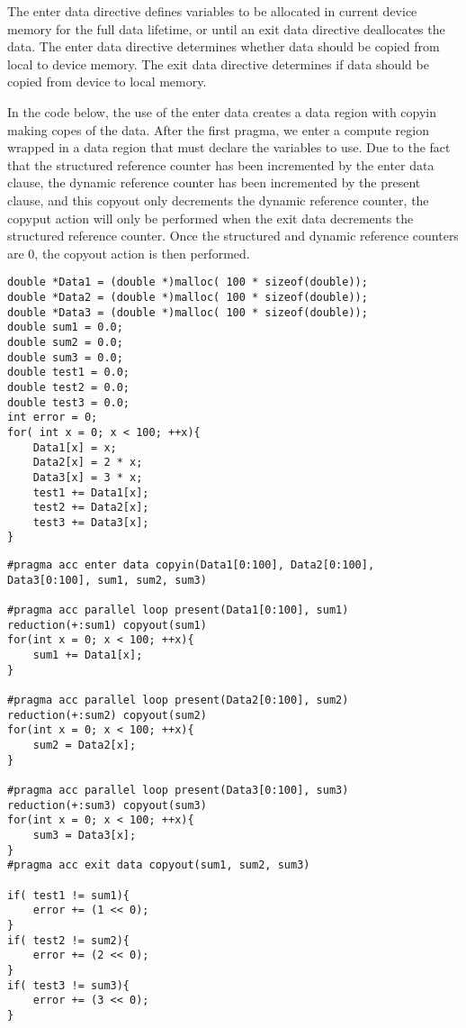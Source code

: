The enter data directive defines variables to be allocated in current device memory for the full data lifetime, or until an exit data directive deallocates the data. The enter data directive determines whether data should be copied from local to device memory. The exit data directive determines if data should be copied from device to local memory\cite{OpenACCSpec}.

In the code below, the use of the enter data creates a data region with copyin making copes of the data. After the first pragma, we enter a compute region wrapped in a data region that must declare the variables to use. Due to the fact that the structured reference counter has been incremented by the enter data clause, the dynamic reference counter has been incremented by the present clause, and this copyout only decrements the dynamic reference counter, the copyput action will only be performed when the exit data decrements the structured reference counter. Once the structured and dynamic reference counters are 0, the copyout action is then performed.

\begin{Code}
\begin{lstlisting}[frame=single, caption=enterDataExitData.c, label=prototype, numbers=none]
double *Data1 = (double *)malloc( 100 * sizeof(double));
double *Data2 = (double *)malloc( 100 * sizeof(double));
double *Data3 = (double *)malloc( 100 * sizeof(double));
double sum1 = 0.0;
double sum2 = 0.0;
double sum3 = 0.0;
double test1 = 0.0;
double test2 = 0.0;
double test3 = 0.0;
int error = 0;
for( int x = 0; x < 100; ++x){
    Data1[x] = x;
    Data2[x] = 2 * x;
    Data3[x] = 3 * x;
    test1 += Data1[x];
    test2 += Data2[x];
    test3 += Data3[x];
}
\end{lstlisting}
\end{Code}

\begin{Code}
\begin{lstlisting}[frame=single, caption=enterDataExitData.c (cont.), label=prototype, numbers=none]
#pragma acc enter data copyin(Data1[0:100], Data2[0:100], Data3[0:100], sum1, sum2, sum3)

#pragma acc parallel loop present(Data1[0:100], sum1) reduction(+:sum1) copyout(sum1)
for(int x = 0; x < 100; ++x){
    sum1 += Data1[x];
}

#pragma acc parallel loop present(Data2[0:100], sum2) reduction(+:sum2) copyout(sum2)
for(int x = 0; x < 100; ++x){
    sum2 = Data2[x];
}

#pragma acc parallel loop present(Data3[0:100], sum3) reduction(+:sum3) copyout(sum3)
for(int x = 0; x < 100; ++x){
    sum3 = Data3[x];
}
#pragma acc exit data copyout(sum1, sum2, sum3)

if( test1 != sum1){
    error += (1 << 0);
}
if( test2 != sum2){
    error += (2 << 0);
}
if( test3 != sum3){
    error += (3 << 0);
}
\end{lstlisting}
\end{Code}
